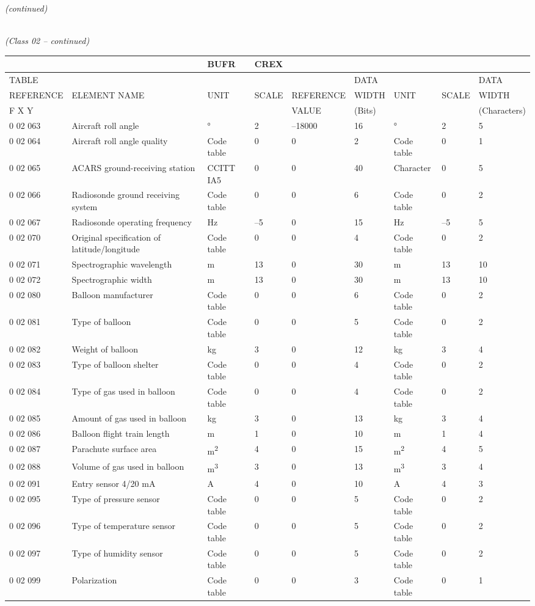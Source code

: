 \emph{(continued)}

\emph{\\
(Class 02 -- continued)}

\begin{longtable}[]{@{}lllllllll@{}}
\toprule
& & BUFR & CREX & & & & &\tabularnewline
\midrule
\endhead
TABLE & & & & & DATA & & & DATA\tabularnewline
REFERENCE & ELEMENT NAME & UNIT & SCALE & REFERENCE & WIDTH & UNIT & SCALE & WIDTH\tabularnewline
F X Y & & & & VALUE & (Bits) & & & (Characters)\tabularnewline
0 02 063 & Aircraft roll angle & ° & 2 & --18000 & 16 & ° & 2 & 5\tabularnewline
0 02 064 & Aircraft roll angle quality & Code table & 0 & 0 & 2 & Code table & 0 & 1\tabularnewline
0 02 065 & ACARS ground-receiving station & CCITT IA5 & 0 & 0 & 40 & Character & 0 & 5\tabularnewline
0 02 066 & Radiosonde ground receiving system & Code table & 0 & 0 & 6 & Code table & 0 & 2\tabularnewline
0 02 067 & Radiosonde operating frequency & Hz & --5 & 0 & 15 & Hz & --5 & 5\tabularnewline
0 02 070 & Original specification of latitude/longitude & Code table & 0 & 0 & 4 & Code table & 0 & 2\tabularnewline
0 02 071 & Spectrographic wavelength & m & 13 & 0 & 30 & m & 13 & 10\tabularnewline
0 02 072 & Spectrographic width & m & 13 & 0 & 30 & m & 13 & 10\tabularnewline
0 02 080 & Balloon manufacturer & Code table & 0 & 0 & 6 & Code table & 0 & 2\tabularnewline
0 02 081 & Type of balloon & Code table & 0 & 0 & 5 & Code table & 0 & 2\tabularnewline
0 02 082 & Weight of balloon & kg & 3 & 0 & 12 & kg & 3 & 4\tabularnewline
0 02 083 & Type of balloon shelter & Code table & 0 & 0 & 4 & Code table & 0 & 2\tabularnewline
0 02 084 & Type of gas used in balloon & Code table & 0 & 0 & 4 & Code table & 0 & 2\tabularnewline
0 02 085 & Amount of gas used in balloon & kg & 3 & 0 & 13 & kg & 3 & 4\tabularnewline
0 02 086 & Balloon flight train length & m & 1 & 0 & 10 & m & 1 & 4\tabularnewline
0 02 087 & Parachute surface area & m\textsuperscript{2} & 4 & 0 & 15 & m\textsuperscript{2} & 4 & 5\tabularnewline
0 02 088 & Volume of gas used in balloon & m\textsuperscript{3} & 3 & 0 & 13 & m\textsuperscript{3} & 3 & 4\tabularnewline
0 02 091 & Entry sensor 4/20 mA & A & 4 & 0 & 10 & A & 4 & 3\tabularnewline
0 02 095 & Type of pressure sensor & Code table & 0 & 0 & 5 & Code table & 0 & 2\tabularnewline
0 02 096 & Type of temperature sensor & Code table & 0 & 0 & 5 & Code table & 0 & 2\tabularnewline
0 02 097 & Type of humidity sensor & Code table & 0 & 0 & 5 & Code table & 0 & 2\tabularnewline
0 02 099 & Polarization & Code table & 0 & 0 & 3 & Code table & 0 & 1\tabularnewline
\bottomrule
\end{longtable}

